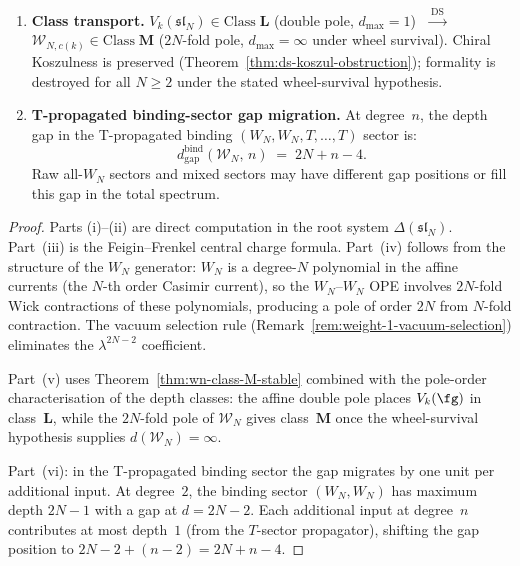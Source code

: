 \begin{theorem}
\begin{enumerate}[label=\textup{(\roman*)}]
 After $d\log$ absorption, the collision residue has maximum pole
 order $2N - 1$ with a gap at $1/z^{2N-1}$:
 \begin{equation}
 \label{eq:wn-collision-gap}
 d_{\mathrm{gap}}(\mathcal{W}_N,\, 2) \;=\; 2N - 2.
 \end{equation}
\item \textbf{Class transport.}
 $V_k(\mathfrak{sl}_N) \in \mathrm{Class}\;\mathbf{L}$
 \textup{(}double pole, $d_{\max} = 1$\textup{)}
 $\;\xrightarrow{\;\mathrm{DS}\;}\;$
 $\mathcal{W}_{N,c(k)} \in \mathrm{Class}\;\mathbf{M}$
 \textup{(}$2N$-fold pole, $d_{\max} = \infty$ under wheel survival\textup{)}.
 Chiral Koszulness is preserved
 \textup{(}Theorem~\textup{\ref{thm:ds-koszul-obstruction})};
 formality is destroyed for all $N \ge 2$ under the stated
 wheel-survival hypothesis.
\item \textbf{T-propagated binding-sector gap migration.}
 At degree~$n$, the depth gap in the T-propagated binding
 $(W_N, W_N, T,\ldots,T)$ sector is:
\begin{equation}
\label{eq:wn-gap-migration}
 d_{\mathrm{gap}}^{\mathrm{bind}}(\mathcal{W}_N,\, n)
 \;=\; 2N + n - 4.
\end{equation}
 Raw all-\(W_N\) sectors and mixed sectors may have different gap
 positions or fill this gap in the total spectrum.
\end{enumerate}
\end{theorem}

\begin{proof}
Parts (i)--(ii) are direct computation in the root system
$\Delta(\mathfrak{sl}_N)$. Part~(iii) is the Feigin--Frenkel
central charge formula. Part~(iv) follows from the structure
of the $W_N$ generator: $W_N$ is a degree-$N$ polynomial in
the affine currents (the $N$-th order Casimir current), so the
$W_N$--$W_N$ OPE involves $2N$-fold Wick contractions of these
polynomials, producing a pole of order $2N$ from $N$-fold
contraction. The vacuum selection rule
(Remark~\ref{rem:weight-1-vacuum-selection}) eliminates the
$\lambda^{2N-2}$ coefficient.

Part~(v) uses Theorem~\ref{thm:wn-class-M-stable}
combined with the pole-order characterisation of the depth classes:
the affine double pole places $V_k(\fg)$ in class~$\mathbf{L}$, while
the $2N$-fold pole of $\mathcal{W}_N$ gives class~$\mathbf{M}$ once the
wheel-survival hypothesis supplies $d(\mathcal{W}_N)=\infty$.

Part~(vi): in the T-propagated binding sector the gap migrates by one unit per
additional input.
At degree~$2$, the binding sector $(W_N, W_N)$ has maximum depth
$2N - 1$ with a gap at $d = 2N - 2$. Each additional input
at degree~$n$ contributes at most depth~$1$ (from the $T$-sector
propagator), shifting the gap position to $2N - 2 + (n - 2)
= 2N + n - 4$.
\end{proof}

